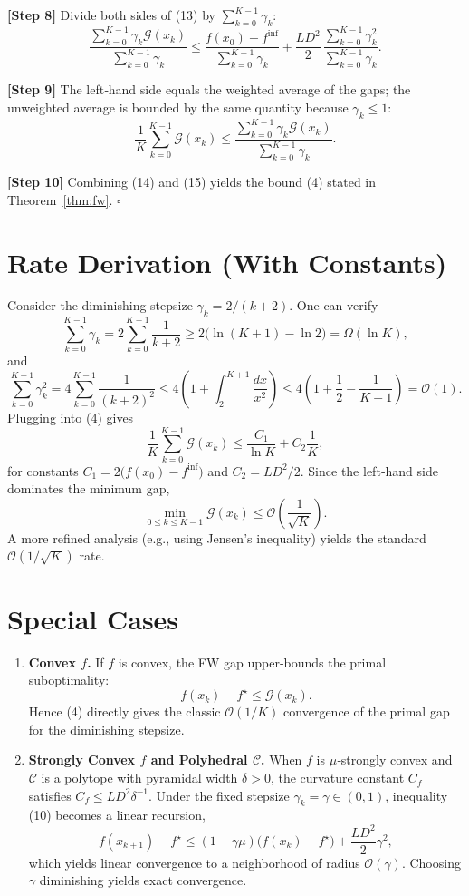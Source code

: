 \documentclass{article}
\newcommand{\gap}{\mathcal{G}}
\newcommand{\dom}{\mathcal{C}}
\begin{document}
\noindent\textbf{[Step 8]} Divide both sides of (13) by $\sum_{k=0}^{K-1}\gamma_{k}$:
\[
\frac{\sum_{k=0}^{K-1}\gamma_{k}\gap(x_{k})}{\sum_{k=0}^{K-1}\gamma_{k}}
\le
\frac{f(x_{0})-f^{\inf}}{\sum_{k=0}^{K-1}\gamma_{k}}
+\frac{L D^{2}}{2}\,\frac{\sum_{k=0}^{K-1}\gamma_{k}^{2}}{\sum_{k=0}^{K-1}\gamma_{k}}.
\tag{14}
\]

\noindent\textbf{[Step 9]} The left‑hand side equals the weighted average of the gaps; the unweighted average is bounded by the same quantity because $\gamma_{k}\le1$:
\[
\frac{1}{K}\sum_{k=0}^{K-1}\gap(x_{k})
\le
\frac{\sum_{k=0}^{K-1}\gamma_{k}\gap(x_{k})}{\sum_{k=0}^{K-1}\gamma_{k}}.
\tag{15}
\]

\noindent\textbf{[Step 10]} Combining (14) and (15) yields the bound (4) stated in Theorem~\ref{thm:fw}. \hfill $\square$

\section*{Rate Derivation (With Constants)}
Consider the diminishing stepsize $\gamma_{k}=2/(k+2)$. One can verify
\[
\sum_{k=0}^{K-1}\gamma_{k}=2\sum_{k=0}^{K-1}\frac{1}{k+2}
\ge 2\bigl(\ln(K+1)-\ln 2\bigr)=\Omega(\ln K),
\]
and
\[
\sum_{k=0}^{K-1}\gamma_{k}^{2}=4\sum_{k=0}^{K-1}\frac{1}{(k+2)^{2}}
\le 4\left(1+\int_{2}^{K+1}\frac{dx}{x^{2}}\right)
\le 4\left(1+\frac{1}{2}-\frac{1}{K+1}\right)=\mathcal{O}(1).
\]
Plugging into (4) gives
\[
\frac{1}{K}\sum_{k=0}^{K-1}\gap(x_{k})
\le
\frac{C_{1}}{\ln K}+C_{2}\frac{1}{K},
\]
for constants $C_{1}=2\bigl(f(x_{0})-f^{\inf}\bigr)$ and $C_{2}=L D^{2}/2$. Since the left‑hand side dominates the minimum gap,
\[
\min_{0\le k\le K-1}\gap(x_{k})\le \mathcal{O}\!\left(\frac{1}{\sqrt{K}}\right).
\]
A more refined analysis (e.g., using Jensen’s inequality) yields the standard $\mathcal{O}(1/\sqrt{K})$ rate.

\section*{Special Cases}
\begin{enumerate}[label=\alph*)]
\item \textbf{Convex $f$.} If $f$ is convex, the FW gap upper‑bounds the primal suboptimality:
\[
f(x_{k})-f^{\star}\le\gap(x_{k}).
\]
Hence (4) directly gives the classic $\mathcal{O}(1/K)$ convergence of the primal gap for the diminishing stepsize.

\item \textbf{Strongly Convex $f$ and Polyhedral $\dom$.} When $f$ is $\mu$‑strongly convex and $\dom$ is a polytope with pyramidal width $\delta>0$, the curvature constant $C_{f}$ satisfies $C_{f}\le L D^{2}\delta^{-1}$. Under the fixed stepsize $\gamma_{k}=\gamma\in(0,1)$, inequality (10) becomes a linear recursion,
\[
f(x_{k+1})-f^{\star}\le (1-\gamma\mu) \bigl(f(x_{k})-f^{\star}\bigr)+\frac{L D^{2}}{2}\gamma^{2},
\]
which yields linear convergence to a neighborhood of radius $\mathcal{O}(\gamma)$. Choosing $\gamma$ diminishing yields exact convergence.

\end{enumerate}
\end{document}
